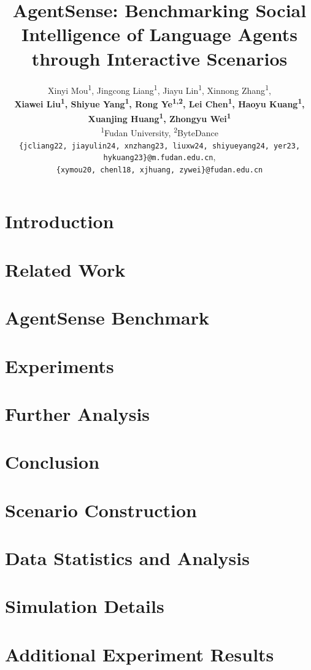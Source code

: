 \documentclass[11pt]{article}
\title{AgentSense: Benchmarking Social Intelligence of Language Agents through Interactive Scenarios}
\author{Xinyi Mou\textsuperscript{\rm 1}\footnotemark[2],
        Jingcong Liang\textsuperscript{\rm 1}\footnotemark[2], 
        Jiayu Lin\textsuperscript{\rm 1}\footnotemark[2], 
        Xinnong Zhang\textsuperscript{\rm 1}\footnotemark[2], \\
        \textbf{Xiawei Liu\textsuperscript{\rm 1},
        Shiyue Yang\textsuperscript{\rm 1},
        Rong Ye\textsuperscript{\rm 1,2},
        Lei Chen\textsuperscript{\rm 1},
        Haoyu Kuang\textsuperscript{\rm 1},}\\
        \textbf{
        Xuanjing Huang\textsuperscript{\rm 1}, 
        Zhongyu Wei\textsuperscript{\rm 1}\footnotemark[3]
        }
        \\ %
        \normalsize\textsuperscript{\rm 1}{Fudan University}, 
        \normalsize\textsuperscript{\rm 2}{ByteDance} \\
        \normalsize\texttt{\{jcliang22, jiayulin24, xnzhang23, liuxw24, shiyueyang24, yer23, hykuang23\}@m.fudan.edu.cn}, \\
        \normalsize\texttt{\{xymou20, chenl18, xjhuang, zywei\}@fudan.edu.cn}
    }
\begin{document}
\maketitle

\begin{abstract}

\end{abstract}


\section{Introduction}


\section{Related Work}


\section{AgentSense Benchmark}


\section{Experiments}


\section{Further Analysis}


\section{Conclusion}




\appendix

\section{Scenario Construction}\label{app:cons}


\section{Data Statistics and Analysis}\label{app:data}


\section{Simulation Details}\label{app:simu}


\section{Additional Experiment Results}\label{app:exp}

\end{document}
